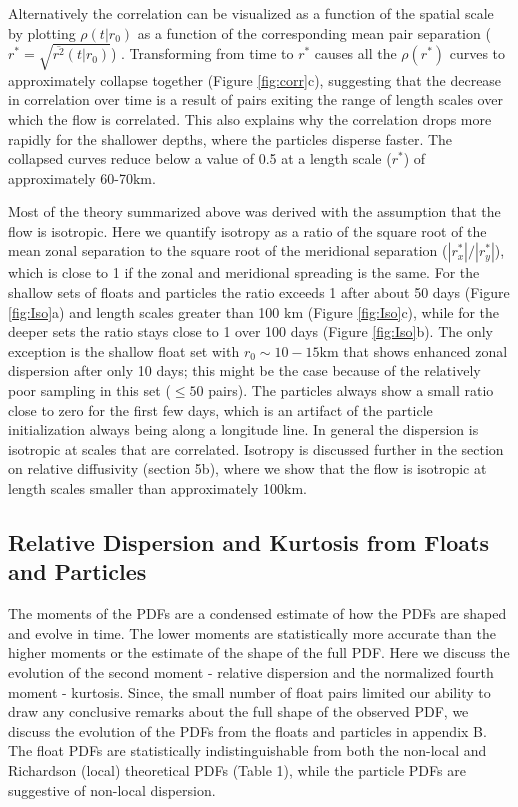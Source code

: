 \documentclass[]{ametsoc}
\begin{document}
Alternatively the correlation can be visualized as a function of the spatial scale by plotting $\rho (t|r_0)$ as a function of the corresponding mean pair separation ($r^* = \sqrt{\overline{r^2}(t|r_0)}$) \citep{koszalka2011surface, graff2015relative}. Transforming from time to $r^*$ causes all the $\rho (r^*)$ curves to approximately collapse together (Figure \ref{fig:corr}c), suggesting that the decrease in correlation over time is a result of pairs exiting the range of length scales over which the flow is correlated. This also explains why the correlation drops more rapidly for the shallower depths, where the particles disperse faster. The collapsed curves reduce below a value of 0.5 at a length scale ($r^*$) of approximately 60-70km. 

Most of the theory summarized above was derived with the assumption that the flow is isotropic. Here we quantify isotropy as a ratio of the square root of the mean zonal separation to the square root of the meridional separation ($|r^*_x|/|r^*_y|$)\citep {morel1974relative}, which is close to 1 if the zonal and meridional spreading is the same. For the shallow sets of floats and particles the ratio exceeds 1 after about 50 days (Figure \ref{fig:Iso}a)  and length scales greater than 100 km (Figure \ref{fig:Iso}c), while for the deeper sets the ratio stays close to 1 over 100 days (Figure \ref{fig:Iso}b). The only exception is the shallow float set with $r_0 \sim 10-15$km that shows enhanced zonal dispersion after only 10 days; this might be the case because of the relatively poor sampling in this set ($\leq 50$ pairs). The particles always show a small ratio close to zero for the first few days, which is an artifact of the particle initialization always being along a longitude line. In general the dispersion is isotropic at scales that are correlated. Isotropy is discussed further in the section on relative diffusivity (section 5b), where we show that the flow is isotropic at length scales smaller than approximately 100km.

\subsection{Relative Dispersion and Kurtosis from Floats and Particles} 
The moments of the PDFs are a condensed estimate of how the PDFs are shaped and evolve in time. The lower moments are statistically more accurate than the higher moments or the estimate of the shape of the full PDF. Here we discuss the evolution of the second moment - relative dispersion and the normalized fourth moment - kurtosis. Since, the small number of float pairs limited our ability to draw any conclusive remarks about the full shape of the observed PDF, we discuss the evolution of the PDFs from the floats and particles in appendix B. The float PDFs are statistically indistinguishable from both the non-local and Richardson (local) theoretical PDFs (Table 1), while the particle PDFs are suggestive of non-local dispersion.
\end{document}
